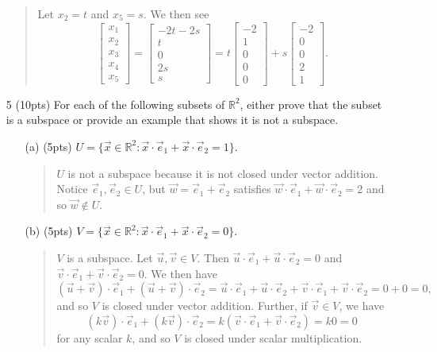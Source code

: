\documentclass{article}
\newcommand{\R}{\mathbb{R}}
\newcommand{\mat}[1]{\begin{bmatrix}#1\end{bmatrix}}
\begin{document}
\begin{enumerate}
\begin{quote}
				Let $x_2=t$ and $x_5=s$.  We then see
				\[
					\mat{x_1\\x_2\\x_3\\x_4\\x_5}=
					\mat{-2t-2s\\t\\0\\2s\\s}
					=
					t\mat{-2\\1\\0\\0\\0}+
					s\mat{-2\\0\\0\\2\\1}.
				\]
			\end{quote}


	\clearpage

	\item[5 (10pts)] For each of the following subsets of $\R^2$, either prove that the subset is a subspace
		or provide an example that shows it is not a subspace.
	\begin{enumerate}
		\item[(a) (5pts)] $U=\{\vec x\in \R^2: \vec x\cdot \vec e_1+\vec x\cdot \vec e_2 = 1\}$.
			\begin{quote}
				$U$ is not a subspace because it is not closed under vector addition.
				Notice $\vec e_1,\vec e_2\in U$, but $\vec w=\vec e_1+\vec e_2$ satisfies
				$\vec w\cdot \vec e_1+\vec w\cdot\vec e_2=2$ and so $\vec w\notin U$.
			\end{quote}
		\vspace{3.2in}
		\item[(b) (5pts)] $V=\{\vec x \in \R^2: \vec x\cdot \vec e_1+\vec x\cdot \vec e_2=0\}$.
			\begin{quote}
				$V$ is a subspace.  Let $\vec u,\vec v\in V$.  Then $\vec u\cdot \vec e_1+\vec u\cdot \vec e_2=0$
				and $\vec v\cdot \vec e_1+\vec v\cdot \vec e_2=0$.  We then have
				\[
					(\vec u+\vec v)\cdot \vec e_1+(\vec u+\vec v)\cdot \vec e_2=
					\vec u\cdot \vec e_1+\vec u\cdot \vec e_2 + \vec v\cdot \vec e_1+\vec v\cdot \vec e_2
					= 0+0 = 0,
				\]
				and so $V$ is closed under vector addition.  Further, if $\vec v\in V$, we have
				\[
					(k\vec v)\cdot \vec e_1+(k\vec v)\cdot \vec e_2=
					k(\vec v\cdot \vec e_1+\vec v\cdot \vec e_2)=k0=0
				\]
				for any scalar $k$, and so $V$ is closed under scalar multiplication.
			\end{quote}
	\end{enumerate}
	\clearpage


\end{enumerate}
\end{document}
